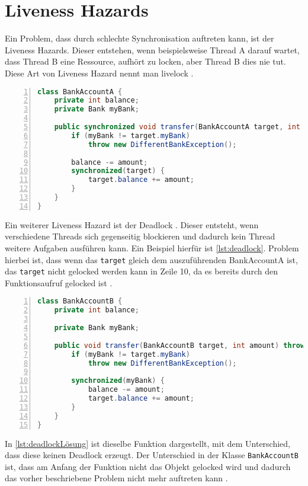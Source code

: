 \section{Liveness Hazards}

Ein Problem, dass durch schlechte Synchronisation auftreten kann, ist der Liveness Hazards. Dieser entstehen, wenn beispielsweise Thread A darauf wartet, dass Thread B eine Ressource, aufhört zu locken, aber Thread B dies nie tut. Diese Art von Liveness Hazard nennt man livelock \cite[vgl.][5-6]{brian}.\\

\begin{lstlisting}[language=Java,frame=tb,caption={Deadlock \cite{fekete_teaching_nodate}}, label={lst:deadlock}, numbers=left, stepnumber=1, captionpos=b, tabsize=4]
class BankAccountA {
    private int balance; 
    private Bank myBank; 

    public synchronized void transfer(BankAccountA target, int amount) throws DifferentBankException {
        if (myBank != target.myBank) 
            throw new DifferentBankException(); 
        
        balance -= amount; 
        synchronized(target) { 
            target.balance += amount; 
        } 
    }
}
\end{lstlisting}
\noindent
Ein weiterer Liveness Hazard ist der Deadlock \cite[vgl.][6]{brian}. Dieser entsteht, wenn verschiedene Threads sich gegenseitig blockieren und dadurch kein Thread weitere Aufgaben ausführen kann. Ein Beispiel hierfür ist \ref{lst:deadlock}. Problem hierbei ist, dass wenn das \texttt{target} gleich dem auszuführenden BankAccountA ist, das \texttt{target} nicht gelocked werden kann in Zeile 10, da es bereits durch den Funktionsaufruf gelocked ist \cite[vgl.][122]{fekete_teaching_nodate}. 
\\
\begin{lstlisting}[language=Java,frame=tb,caption={Deadlock Lösung \cite{fekete_teaching_nodate}}, label={lst:deadlockLösung}, numbers=left, stepnumber=1, captionpos=b, tabsize=4]
class BankAccountB { 
    private int balance; 
    
    private Bank myBank; 

    public void transfer(BankAccountB target, int amount) throws DifferentBankException { 
        if (myBank != target.myBank)
            throw new DifferentBankException(); 
        
        synchronized(myBank) { 
            balance -= amount; 
            target.balance += amount; 
        } 
    }
}
\end{lstlisting}
\noindent
In \ref{lst:deadlockLösung} ist dieselbe Funktion dargestellt, mit dem Unterschied, dass diese keinen Deadlock erzeugt. Der Unterschied in der Klasse \texttt{BankAccountB} ist, dass am Anfang der Funktion nicht das Objekt gelocked wird und dadurch das vorher beschriebene Problem nicht mehr auftreten kann \cite[vgl.][122]{fekete_teaching_nodate}.